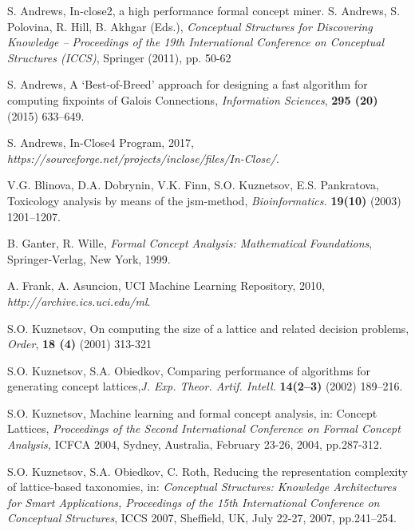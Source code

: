 \documentclass[11pt]{article}
\numberwithin{equation}{subsection}
\begin{document}
\vspace{0.2cm}
\begin{thebibliography}{aa}


S. Andrews,
In-close2, a high performance formal concept miner.
S. Andrews, S. Polovina, R. Hill, B. Akhgar (Eds.), \textit{Conceptual Structures for Discovering Knowledge – Proceedings of the 19th International Conference on Conceptual Structures (ICCS)}, Springer (2011), pp. 50-62

S. Andrews,   A ‘Best-of-Breed’ approach for designing a fast algorithm
for computing fixpoints of Galois Connections, \textit{Information Sciences}, \textbf{295 (20)} (2015) 633--649.

S. Andrews, In-Close4 Program, 2017,
\textit{https://sourceforge.net/projects/inclose/files/In-Close/}.


 V.G. Blinova, D.A. Dobrynin, V.K. Finn, S.O. Kuznetsov, E.S. Pankratova, Toxicology analysis by means of the jsm-method, \textit{ Bioinformatics.} \textbf{19(10)} (2003) 1201--1207.



B. Ganter, R. Wille, \textit{Formal Concept Analysis:  Mathematical Foundations}, Springer-Verlag, New York, 1999.

A. Frank,  A. Asuncion, UCI Machine Learning Repository, 2010, \textit{http://archive.ics.uci.edu/ml}.


S.O. Kuznetsov,
On computing the size of a lattice and related decision problems,
\textit{Order}, \textbf{18 (4)} (2001) 313-321

S.O. Kuznetsov, S.A. Obiedkov, Comparing performance of algorithms for generating concept lattices,\textit{J. Exp. Theor. Artif. Intell.} \textbf{14(2--3)} (2002) 189--216.

 S.O. Kuznetsov, Machine learning and formal concept analysis, in: Concept Lattices, \textit{Proceedings of the Second International Conference on Formal Concept Analysis,} ICFCA 2004, Sydney, Australia, February 23-26, 2004,  pp.287-312.


S.O. Kuznetsov, S.A. Obiedkov, C. Roth, Reducing the representation complexity of lattice-based taxonomies, in: \textit{Conceptual Structures: Knowledge Architectures for Smart Applications, Proceedings of the 15th International Conference on Conceptual Structures}, ICCS 2007, Sheffield, UK, July 22-27, 2007,  pp.241--254.





\end{thebibliography}
\end{document}

